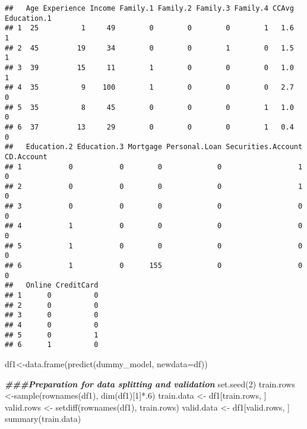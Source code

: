 \documentclass[
]{article}
\newenvironment{Shaded}{\begin{snugshade}}{\end{snugshade}}
\newcommand{\AttributeTok}[1]{\textcolor[rgb]{0.77,0.63,0.00}{#1}}
\newcommand{\DecValTok}[1]{\textcolor[rgb]{0.00,0.00,0.81}{#1}}
\newcommand{\DocumentationTok}[1]{\textcolor[rgb]{0.56,0.35,0.01}{\textbf{\textit{#1}}}}
\newcommand{\FunctionTok}[1]{\textcolor[rgb]{0.00,0.00,0.00}{#1}}
\newcommand{\NormalTok}[1]{#1}
\newcommand{\OtherTok}[1]{\textcolor[rgb]{0.56,0.35,0.01}{#1}}
\newcommand{\SpecialCharTok}[1]{\textcolor[rgb]{0.00,0.00,0.00}{#1}}
\begin{document}
\begin{verbatim}
##   Age Experience Income Family.1 Family.2 Family.3 Family.4 CCAvg Education.1
## 1  25          1     49        0        0        0        1   1.6           1
## 2  45         19     34        0        0        1        0   1.5           1
## 3  39         15     11        1        0        0        0   1.0           1
## 4  35          9    100        1        0        0        0   2.7           0
## 5  35          8     45        0        0        0        1   1.0           0
## 6  37         13     29        0        0        0        1   0.4           0
##   Education.2 Education.3 Mortgage Personal.Loan Securities.Account CD.Account
## 1           0           0        0             0                  1          0
## 2           0           0        0             0                  1          0
## 3           0           0        0             0                  0          0
## 4           1           0        0             0                  0          0
## 5           1           0        0             0                  0          0
## 6           1           0      155             0                  0          0
##   Online CreditCard
## 1      0          0
## 2      0          0
## 3      0          0
## 4      0          0
## 5      0          1
## 6      1          0
\end{verbatim}

\begin{Shaded}
\begin{Highlighting}[]
\NormalTok{df1}\OtherTok{\textless{}{-}}\FunctionTok{data.frame}\NormalTok{(}\FunctionTok{predict}\NormalTok{(dummy\_model, }\AttributeTok{newdata=}\NormalTok{df))}
\end{Highlighting}
\end{Shaded}

\begin{Shaded}
\begin{Highlighting}[]
\DocumentationTok{\#\#\#Preparation for data splitting and validation}
\FunctionTok{set.seed}\NormalTok{(}\DecValTok{2}\NormalTok{)}
\NormalTok{train.rows }\OtherTok{\textless{}{-}}\FunctionTok{sample}\NormalTok{(}\FunctionTok{rownames}\NormalTok{(df1), }\FunctionTok{dim}\NormalTok{(df1)[}\DecValTok{1}\NormalTok{]}\SpecialCharTok{*}\NormalTok{.}\DecValTok{6}\NormalTok{)}
\NormalTok{train.data }\OtherTok{\textless{}{-}}\NormalTok{ df1[train.rows, ]}
\NormalTok{valid.rows }\OtherTok{\textless{}{-}} \FunctionTok{setdiff}\NormalTok{(}\FunctionTok{rownames}\NormalTok{(df1), train.rows)}
\NormalTok{valid.data }\OtherTok{\textless{}{-}}\NormalTok{ df1[valid.rows, ]}
\FunctionTok{summary}\NormalTok{(train.data)}
\end{Highlighting}
\end{Shaded}
\end{document}
